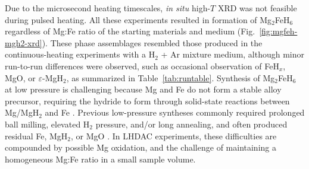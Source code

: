 \documentclass[draft,jgrga,12pt]{agujournal2019}
\begin{document}
Due to the microsecond heating timescales, \textit{in situ} high-$T$ XRD was not feasible during pulsed heating. 
All these experiments resulted in formation of Mg$_2$FeH$_6$ regardless of Mg:Fe ratio of the starting materials and medium (Fig.~\ref{fig:mgfeh-mgh2-xrd}). 
These phase assemblages resembled those produced in the continuous-heating experiments with a H$_2$ + Ar mixture medium, although minor run-to-run differences were observed, such as occasional observation of FeH$_x$, MgO, or $\varepsilon$-MgH$_2$, as summarized in Table~\ref{tab:runtable}.
Synthesis of Mg$_2$FeH$_6$ at low pressure is challenging because Mg and Fe do not form a stable alloy precursor, requiring the hydride to form through solid-state reactions between Mg/MgH$_2$ and Fe \cite{puszkiel_new_2018}. Previous low-pressure syntheses commonly required prolonged ball milling, elevated H$_2$ pressure, and/or long annealing, and often produced residual Fe, MgH$_2$, or MgO \cite{wang_preparation_2010}. 
In LHDAC experiments, these difficulties are compounded by possible Mg oxidation, and the challenge of maintaining a homogeneous Mg:Fe ratio in a small sample volume.


\end{document}
